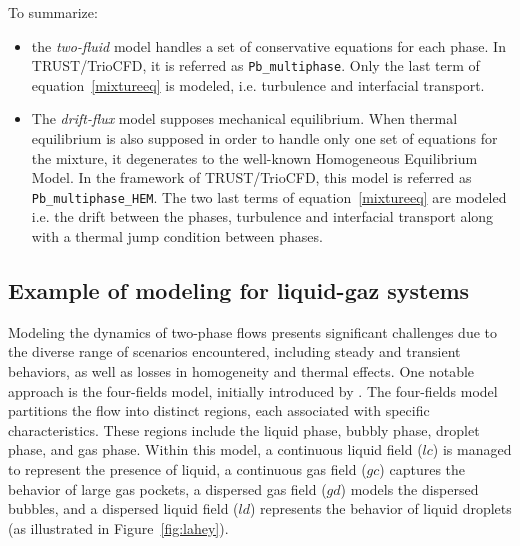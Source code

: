 To summarize:
\begin{itemize}
  \item[\small \textcolor{blue}{\ding{109}}] the \emph{two-fluid} model handles a set of conservative equations for each phase. In TRUST/TrioCFD, it is referred as \texttt{Pb\_multiphase}. Only the last term of equation~\ref{mixtureeq} is modeled, i.e. turbulence and interfacial transport.
  \item[\small \textcolor{blue}{\ding{109}}] The \emph{drift-flux} model supposes mechanical equilibrium. When thermal equilibrium is also supposed in order to handle only one set of equations for the mixture, it degenerates to the well-known Homogeneous Equilibrium Model. In the framework of TRUST/TrioCFD, this model is referred as \texttt{Pb\_multiphase\_HEM}. The two last terms of equation~\ref{mixtureeq} are modeled i.e. the drift between the phases, turbulence and interfacial transport along with a thermal jump condition between phases.
\end{itemize}

\subsection{Example of modeling for liquid-gaz systems}

Modeling the dynamics of two-phase flows presents significant challenges due to the diverse range of scenarios encountered, including steady and transient behaviors, as well as losses in homogeneity and thermal effects. One notable approach is the four-fields model, initially introduced by \cite{Lahey2001}. The four-fields model partitions the flow into distinct regions, each associated with specific characteristics. These regions include the liquid phase, bubbly phase, droplet phase, and gas phase. Within this model, a continuous liquid field ($lc$) is managed to represent the presence of liquid, a continuous gas field ($gc$) captures the behavior of large gas pockets, a dispersed gas field ($gd$) models the dispersed bubbles, and a dispersed liquid field ($ld$) represents the behavior of liquid droplets (as illustrated in Figure~\ref{fig:lahey}).

